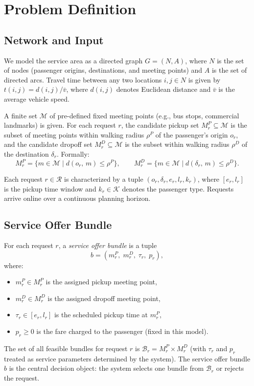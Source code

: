 
\section*{Problem Definition}

\subsection*{Network and Input}

We model the service area as a directed graph $G = (N, A)$, where $N$ is the set of nodes
(passenger origins, destinations, and meeting points) and $A$ is the set of directed arcs.
Travel time between any two locations $i, j \in N$ is given by $t(i,j) = d(i,j) / \bar{v}$,
where $d(i,j)$ denotes Euclidean distance and $\bar{v}$ is the average vehicle speed.

A finite set $\mathcal{M}$ of pre-defined fixed meeting points (e.g., bus stops, commercial
landmarks) is given. For each request $r$, the candidate pickup set
$M_r^P \subseteq \mathcal{M}$ is the subset of meeting points within walking radius $\rho^P$
of the passenger's origin $o_r$, and the candidate dropoff set
$M_r^D \subseteq \mathcal{M}$ is the subset within walking radius $\rho^D$ of the destination
$\delta_r$. Formally:
\begin{equation}
  M_r^P = \bigl\{ m \in \mathcal{M} \mid d(o_r,\, m) \leq \rho^P \bigr\},
  \qquad
  M_r^D = \bigl\{ m \in \mathcal{M} \mid d(\delta_r,\, m) \leq \rho^D \bigr\}.
\end{equation}

Each request $r \in \mathcal{R}$ is characterized by a tuple $(o_r, \delta_r, e_r, l_r, k_r)$,
where $[e_r, l_r]$ is the pickup time window and $k_r \in \mathcal{K}$ denotes the passenger
type. Requests arrive online over a continuous planning horizon.

\subsection*{Service Offer Bundle}

For each request $r$, a \emph{service offer bundle} is a tuple
\[
  b = (m_r^P,\; m_r^D,\; \tau_r,\; p_r),
\]
where:
\begin{itemize}
  \item $m_r^P \in M_r^P$ is the assigned pickup meeting point,
  \item $m_r^D \in M_r^D$ is the assigned dropoff meeting point,
  \item $\tau_r \in [e_r, l_r]$ is the scheduled pickup time at $m_r^P$,
  \item $p_r \geq 0$ is the fare charged to the passenger (fixed in this model).
\end{itemize}
The set of all feasible bundles for request $r$ is $\mathcal{B}_r = M_r^P \times M_r^D$
(with $\tau_r$ and $p_r$ treated as service parameters determined by the system).
The service offer bundle $b$ is the central decision object: the system selects one bundle
from $\mathcal{B}_r$ or rejects the request.

